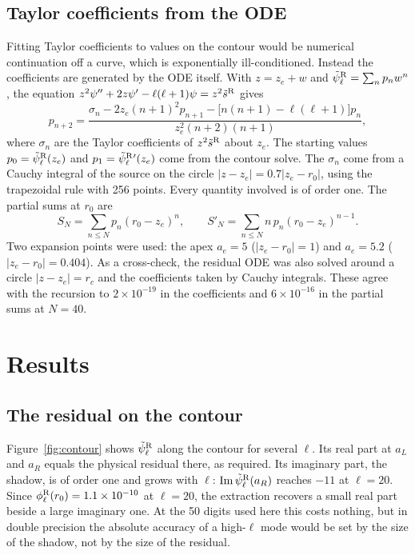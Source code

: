 \documentclass[11pt,a4paper]{article}
\renewcommand{\Im}{\operatorname{Im}}
\newcommand{\psiR}{\tilde\psi^{\rm R}_\ell}
\newcommand{\phiR}{\phi^{\rm R}_\ell}
\begin{document}
\subsection{Taylor coefficients from the ODE}
Fitting Taylor coefficients to values on the contour would be numerical continuation off a curve, which is exponentially ill-conditioned.
Instead the coefficients are generated by the ODE itself.
With $z=z_e+w$ and $\psiR=\sum_n p_nw^n$, the equation $z^2\psi''+2z\psi'-\ell(\ell+1)\psi=z^2\tilde s^{\rm R}$ gives
\begin{equation}
p_{n+2}=\frac{\sigma_n-2z_e(n+1)^2p_{n+1}-\big[n(n+1)-\ell(\ell+1)\big]p_n}{z_e^2(n+2)(n+1)},
\label{eq:recursion}
\end{equation}
where $\sigma_n$ are the Taylor coefficients of $z^2\tilde s^{\rm R}$ about $z_e$.
The starting values $p_0=\psiR(z_e)$ and $p_1=\psiR{}'(z_e)$ come from the contour solve.
The $\sigma_n$ come from a Cauchy integral of the source on the circle $|z-z_e|=0.7|z_e-r_0|$, using the trapezoidal rule with 256 points.
Every quantity involved is of order one.
The partial sums at $r_0$ are
\begin{equation}
S_N=\sum_{n\le N}p_n(r_0-z_e)^n,\qquad S'_N=\sum_{n\le N}n\,p_n(r_0-z_e)^{n-1}.
\end{equation}
Two expansion points were used: the apex $a_e=5$ ($|z_e-r_0|=1$) and $a_e=5.2$ ($|z_e-r_0|=0.404$).
As a cross-check, the residual ODE was also solved around a circle $|z-z_e|=r_c$ and the coefficients taken by Cauchy integrals.
These agree with the recursion to $2\times10^{-19}$ in the coefficients and $6\times10^{-16}$ in the partial sums at $N=40$.

\section{Results}\label{sec:results}

\subsection{The residual on the contour}
Figure~\ref{fig:contour} shows $\psiR$ along the contour for several $\ell$.
Its real part at $a_L$ and $a_R$ equals the physical residual there, as required.
Its imaginary part, the shadow, is of order one and grows with $\ell$: $\Im\psiR(a_R)$ reaches $-11$ at $\ell=20$.
Since $\phiR(r_0)=1.1\times10^{-10}$ at $\ell=20$, the extraction recovers a small real part beside a large imaginary one.
At the 50 digits used here this costs nothing, but in double precision the absolute accuracy of a high-$\ell$ mode would be set by the size of the shadow, not by the size of the residual.
\end{document}
